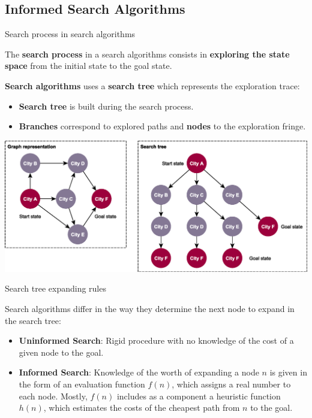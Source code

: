 \documentclass[9pt]{beamer}
\begin{document}
\subsection{Informed Search Algorithms}

\begin{frame}{Search process in search algorithms}
\begin{small}

The \textbf{search process} in a search algorithms consists in \textbf{exploring the state space} from the initial state to the goal state.

\textbf{Search algorithms} uses a \textbf{search tree} which represents the exploration trace:
\vspace{-3mm}
\begin{itemize}
    \item \textbf{Search tree} is built during the search process.
    \item \textbf{Branches} correspond to explored paths and \textbf{nodes} to the exploration fringe.
\end{itemize}

\begin{center}
    \includegraphics[keepaspectratio, width=0.9\linewidth]{images/tree.eps}
\end{center}
\end{small}
\end{frame}

\begin{frame}{Search tree expanding rules}
\begin{small}
Search algorithms differ in the way they determine the next node to expand in the search tree:

\begin{itemize}
    \item \textbf{Uninformed Search}: Rigid procedure with no knowledge of the cost of a given node to the goal.
    \item \textbf{Informed Search}: Knowledge of the worth of expanding a node $n$ is given in the form of an evaluation function $f(n)$, which assigns a real number to each node. Mostly, $f(n)$ includes as a component a heuristic function $h(n)$, which estimates the costs of the cheapest path from $n$ to the goal.\\
\end{itemize}

\end{small}
\end{frame}
\end{document}
